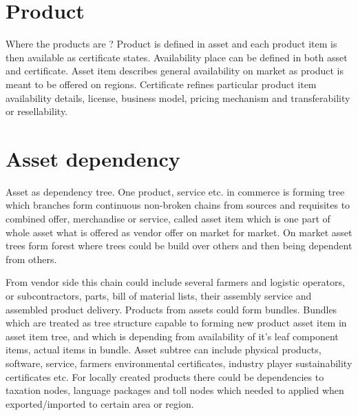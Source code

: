 \section{Product}
\label{product}
Where the products are ?
Product is defined in asset and each product item is then available as certificate states. Availability place can be defined in both asset and certificate. Asset item describes general availability on market as product is meant to be offered on regions. Certificate refines particular product item availability details, license, business model, pricing mechanism and transferability or resellability.


\section{Asset dependency}
\label{dependency}
Asset as dependency tree.
One product, service etc. in commerce is forming tree which branches form continuous non-broken chains from sources and requisites to combined offer, merchandise or service, called asset item which is one part of whole asset what is offered as vendor offer on market for market. On market asset trees form forest where trees could be build over others and then being dependent from others.

From vendor side this chain could include several farmers and logistic operators, or subcontractors, parts, bill of material lists, their assembly service and assembled product delivery. Products from assets could form bundles. Bundles which are treated as tree structure capable to forming new product asset item in asset item tree, and which is depending from availability of it's leaf component items, actual items in bundle. Asset subtree can include physical products, software, service, farmers environmental certificates, industry player sustainability certificates etc. For locally created products there could be dependencies to taxation nodes, language packages and toll nodes which needed to applied when exported/imported to certain area or region.

